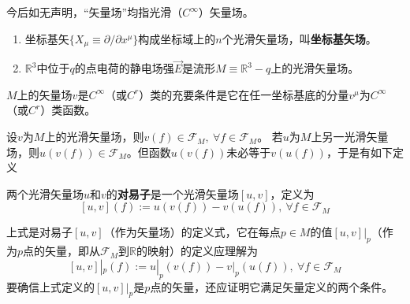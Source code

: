 今后如无声明，``矢量场''均指光滑（$C^\infty$）矢量场。

\begin{example}
\begin{enumerate}[（1）]
\item 坐标基矢$\{X_\mu \equiv \partial / \partial x^\mu\}$构成坐标域上的$n$个光滑矢量场，叫\textbf{坐标基矢场}。
\item $\mathbb{R}^3$中位于$q$的点电荷的静电场强$\vec{E}$是流形$M \equiv \mathbb{R}^3 - {q}$上的光滑矢量场。
\end{enumerate}
\end{example}

\begin{theorem}
$M$上的矢量场$v$是$C^\infty$（或$C^r$）类的充要条件是它在任一坐标基底的分量$v^\mu$为$C^\infty$（或$C^r$）类函数。
\end{theorem}

设$v$为$M$上的光滑矢量场，则$v(f) \in \mathscr{F}_M, ~ \forall f \in \mathscr{F}_M$。
若$u$为$M$上另一光滑矢量场，则$u(v(f)) \in \mathscr{F}_M$。但函数$u(v(f))$未必等于$v(u(f))$，于是有如下定义

\begin{definition}
两个光滑矢量场$u$和$v$的\textbf{对易子}是一个光滑矢量场$[u, v]$，定义为
$$[u, v](f) := u(v(f)) - v(u(f)), ~ \forall f \in \mathscr{F}_M$$
\end{definition}

\begin{note}
上式是对易子$[u, v]$（作为矢量场）的定义式，它在每点$p \in M$的值$[u, v]|_p$（作为$p$点的矢量，即从$\mathscr{F}_M$到$\mathbb{R}$的映射）的定义应理解为
$$[u, v]|_p(f) := u|_p(v(f)) - v|_p(u(f)), ~ \forall f \in \mathscr{F}_M$$
要确信上式定义的$[u, v]|_p$是$p$点的矢量，还应证明它满足矢量定义的两个条件。
\end{note}
